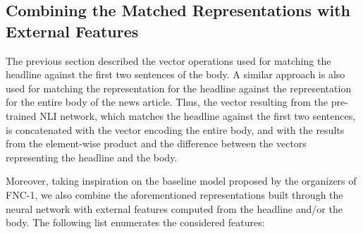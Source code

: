 \subsection{Combining the Matched Representations with External Features}

The previous section described the vector operations used for matching the headline against the first two sentences of the body. A similar approach is also used for matching the representation for the  headline against the representation for the entire body of the news article. Thus, the vector resulting from the pre-trained NLI network, which matches the headline against the first two sentences, is concatenated with the vector encoding the entire body, and with the results from the element-wise product and the difference between the vectors representing the headline and the body.

Moreover, taking inspiration on the baseline model proposed by the organizers of FNC-1, we also combine the aforementioned representations built through the neural network with external features computed from the headline and/or the body. The following list enumerates the considered features:

